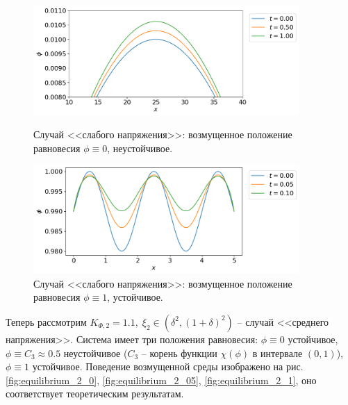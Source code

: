 \begin{figure}[!t]
    \centering
    \includegraphics[width=0.9\textwidth]{figures/equilibrium_1_0.png}
    \vspace{-0.3cm}
    \caption{Случай <<слабого напряжения>>: возмущенное положение равновесия $\phi \equiv 0$, неустойчивое.}
    \label{fig:equilibrium_1_0}
    \vspace{0.5cm}
    
    \includegraphics[width=0.9\textwidth]{figures/equilibrium_1_1.png}
    \vspace{-0.3cm}
    \caption{Случай <<слабого напряжения>>: возмущенное положение равновесия $\phi \equiv 1$, устойчивое.}
    \label{fig:equilibrium_1_1}
\end{figure}

Теперь рассмотрим $K_{\Phi, 2} = 1.1, \; \xi_2 \in (\delta^2, (1 + \delta)^2)$ -- случай <<среднего напряжения>>. Система имеет три положения равновесия: $\phi \equiv 0$ устойчивое, $\phi \equiv C_3 \approx 0.5$ неустойчивое ($C_3$ -- корень функции $\chi(\phi)$ в интервале $(0, 1)$), $\phi \equiv 1$ устойчивое. Поведение возмущенной среды изображено на \linebreak рис. \ref{fig:equilibrium_2_0}, \ref{fig:equilibrium_2_05}, \ref{fig:equilibrium_2_1}, оно соответствует теоретическим результатам.

